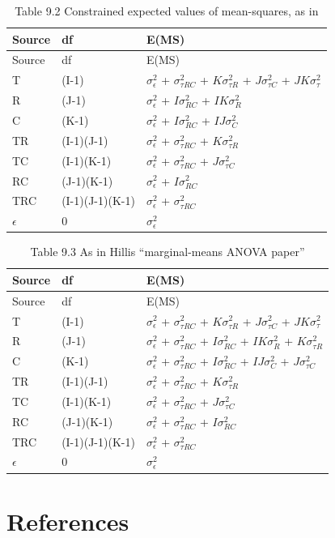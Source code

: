 \documentclass[
]{book}
\begin{document}
\begin{longtable}[]{@{}lll@{}}
\caption{Table 9.2 Constrained expected values of mean-squares, as in \citep{RN204}}\tabularnewline
\toprule
Source & df & E(MS)\tabularnewline
\midrule
\endfirsthead
\toprule
Source & df & E(MS)\tabularnewline
\midrule
\endhead
T & (I-1) & \(\sigma_{\epsilon}^{2}\) + \(\sigma_{\tau RC}^{2}\) + \(K\sigma_{\tau R}^{2}\) + \(J\sigma_{\tau C}^{2}\) + \(JK\sigma_{\tau}^{2}\)\tabularnewline
R & (J-1) & \(\sigma_{\epsilon}^{2}\) + \(I\sigma_{RC}^{2}\) + \(IK\sigma_{R}^{2}\)\tabularnewline
C & (K-1) & \(\sigma_{\epsilon}^{2}\) + \(I\sigma_{RC}^{2}\) + \(IJ\sigma_{C}^{2}\)\tabularnewline
TR & (I-1)(J-1) & \(\sigma_{\epsilon}^{2}\) + \(\sigma_{\tau RC}^{2}\) + \(K\sigma_{\tau R}^{2}\)\tabularnewline
TC & (I-1)(K-1) & \(\sigma_{\epsilon}^{2}\) + \(\sigma_{\tau RC}^{2}\) + \(J\sigma_{\tau C}^{2}\)\tabularnewline
RC & (J-1)(K-1) & \(\sigma_{\epsilon}^{2}\) + \(I\sigma_{RC}^{2}\)\tabularnewline
TRC & (I-1)(J-1)(K-1) & \(\sigma_{\epsilon}^{2}\) + \(\sigma_{\tau RC}^{2}\)\tabularnewline
\(\epsilon\) & 0 & \(\sigma_{\epsilon}^{2}\)\tabularnewline
\bottomrule
\end{longtable}

\begin{longtable}[]{@{}lll@{}}
\caption{Table 9.3 As in Hillis ``marginal-means ANOVA paper'' \citep{RN2508}}\tabularnewline
\toprule
Source & df & E(MS)\tabularnewline
\midrule
\endfirsthead
\toprule
Source & df & E(MS)\tabularnewline
\midrule
\endhead
T & (I-1) & \(\sigma_{\epsilon}^{2}\) + \(\sigma_{\tau RC}^{2}\) + \(K\sigma_{\tau R}^{2}\) + \(J\sigma_{\tau C}^{2}\) + \(JK\sigma_{\tau}^{2}\)\tabularnewline
R & (J-1) & \(\sigma_{\epsilon}^{2}\) + \(\sigma_{\tau RC}^{2}\) + \(I\sigma_{RC}^{2}\) + \(IK\sigma_{R}^{2}\) + \(K\sigma_{\tau R}^{2}\)\tabularnewline
C & (K-1) & \(\sigma_{\epsilon}^{2}\) + \(\sigma_{\tau RC}^{2}\) + \(I\sigma_{RC}^{2}\) + \(IJ\sigma_{C}^{2}\) + \(J\sigma_{\tau C}^{2}\)\tabularnewline
TR & (I-1)(J-1) & \(\sigma_{\epsilon}^{2}\) + \(\sigma_{\tau RC}^{2}\) + \(K\sigma_{\tau R}^{2}\)\tabularnewline
TC & (I-1)(K-1) & \(\sigma_{\epsilon}^{2}\) + \(\sigma_{\tau RC}^{2}\) + \(J\sigma_{\tau C}^{2}\)\tabularnewline
RC & (J-1)(K-1) & \(\sigma_{\epsilon}^{2}\) + \(\sigma_{\tau RC}^{2}\) + \(I\sigma_{RC}^{2}\)\tabularnewline
TRC & (I-1)(J-1)(K-1) & \(\sigma_{\epsilon}^{2}\) + \(\sigma_{\tau RC}^{2}\)\tabularnewline
\(\epsilon\) & 0 & \(\sigma_{\epsilon}^{2}\)\tabularnewline
\bottomrule
\end{longtable}

\hypertarget{DBMAnalysisSigtesting-references}{%
\section{References}\label{DBMAnalysisSigtesting-references}}
\end{document}
